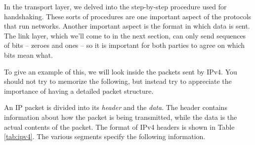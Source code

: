 In the transport layer, we delved into the step-by-step procedure used for handshaking. These sorts of procedures are one important aspect of the protocols that run networks. Another important aspect is the format in which data is sent. The link layer, which we'll come to in the next section, can only send sequences of bits -- zeroes and ones -- so it is important for both parties to agree on which bits mean what.

To give an example of this, we will look inside the packets sent by IPv4. You should not try to memorize the following, but instead try to appreciate the importance of having a detailed packet structure.

An IP packet is divided into its \emph{header} and the \emph{data}. The header contains information about how the packet is being transmitted, while the data is the actual contents of the packet. The format of IPv4 headers is shown in Table \ref{tab:ipv4}. The various segments specify the following information.
